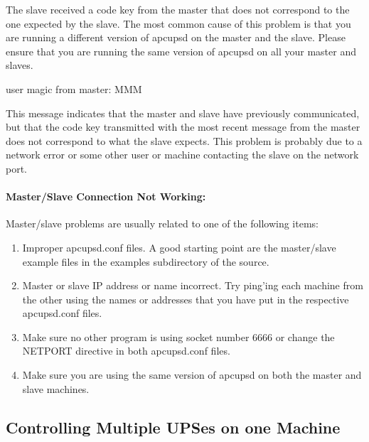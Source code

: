 {{{{{{{{{The slave received a code key from the master that does not correspond to the
one expected by the slave. The most common cause of this problem is that you
are running a different version of apcupsd on the master and the slave. Please
ensure that you are running the same version of apcupsd on all your master and
slaves. 

\label{Bad-user-magic-from-master_003b-MMM}

{\smallBad user magic from master: MMM}

This message indicates that the master and slave have previously communicated,
but that the code key transmitted with the most recent message from the master
does not correspond to what the slave expects. This problem is probably due to
a network error or some other user or machine contacting the slave on the
network port. 

\label{Master_002fSlave-Connection-Not-Working}

\paragraph*{Master/Slave Connection Not Working:}

Master/slave problems are usually related to one of the following items:  

\begin{enumerate}
\item Improper apcupsd.conf files. A good starting point are the master/slave
example files in the examples subdirectory of the source.  
\item Master or slave IP address or name incorrect. Try ping'ing each machine
from the other using the names or addresses that you have put in the
respective apcupsd.conf files.  
\item Make sure no other program is using socket number 6666 or change the
NETPORT directive in both apcupsd.conf files.  
\item Make sure you are using the same version of apcupsd on both the master
and slave machines.  
\end{enumerate}

\label{Controlling-Multiple-UPSes-on-one-Machine}

\subsection*{Controlling Multiple UPSes on one Machine}

}}}}}}}}}
